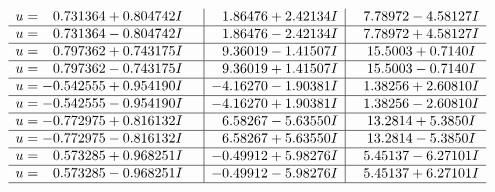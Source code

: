 \documentclass[1p]{elsarticle_modified}
\theoremstyle{definition}
\begin{document}
$$\begin{array}{c|c|c}
\begin{aligned}
u &= \phantom{-}0.731364 + 0.804742 I\end{aligned}
 & \phantom{-}1.86476 + 2.42134 I & \phantom{-}7.78972 - 4.58127 I \\ \hline\begin{aligned}
u &= \phantom{-}0.731364 - 0.804742 I\end{aligned}
 & \phantom{-}1.86476 - 2.42134 I & \phantom{-}7.78972 + 4.58127 I \\ \hline\begin{aligned}
u &= \phantom{-}0.797362 + 0.743175 I\end{aligned}
 & \phantom{-}9.36019 - 1.41507 I & \phantom{-}15.5003 + 0.7140 I \\ \hline\begin{aligned}
u &= \phantom{-}0.797362 - 0.743175 I\end{aligned}
 & \phantom{-}9.36019 + 1.41507 I & \phantom{-}15.5003 - 0.7140 I \\ \hline\begin{aligned}
u &= -0.542555 + 0.954190 I\end{aligned}
 & -4.16270 - 1.90381 I & \phantom{-}1.38256 + 2.60810 I \\ \hline\begin{aligned}
u &= -0.542555 - 0.954190 I\end{aligned}
 & -4.16270 + 1.90381 I & \phantom{-}1.38256 - 2.60810 I \\ \hline\begin{aligned}
u &= -0.772975 + 0.816132 I\end{aligned}
 & \phantom{-}6.58267 - 5.63550 I & \phantom{-}13.2814 + 5.3850 I \\ \hline\begin{aligned}
u &= -0.772975 - 0.816132 I\end{aligned}
 & \phantom{-}6.58267 + 5.63550 I & \phantom{-}13.2814 - 5.3850 I \\ \hline\begin{aligned}
u &= \phantom{-}0.573285 + 0.968251 I\end{aligned}
 & -0.49912 + 5.98276 I & \phantom{-}5.45137 - 6.27101 I \\ \hline\begin{aligned}
u &= \phantom{-}0.573285 - 0.968251 I\end{aligned}
 & -0.49912 - 5.98276 I & \phantom{-}5.45137 + 6.27101 I\\
 \hline 
 \end{array}$$\newpage$$\begin{array}{c|c|c}  

\end{array}$$
\end{document}
